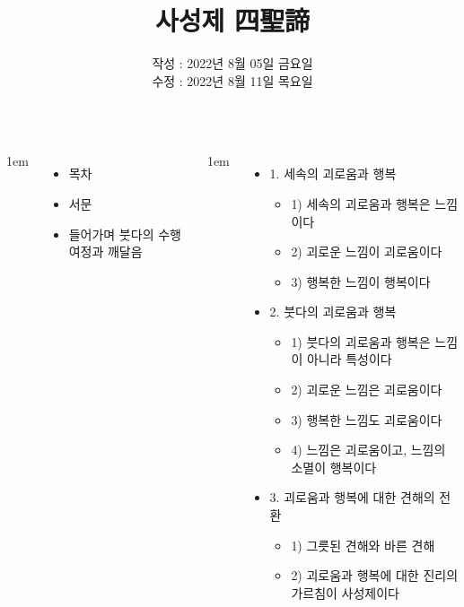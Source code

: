 \documentclass[	17pt, 
							a1paper, 
							portrait, %
							margin=0mm, %
							innermargin=10mm,  		%
							colspace=5mm, 
							subcolspace=0mm
							]{tikzposter}
\title{사성제 四聖諦}
\author{ 	작성 : 2022년 8월 05일 금요일 \\
				수정 : 2022년 8월 11일 목요일  }
\begin{document}
	\maketitle

	\begin{columns}


			{
					\setlength{\leftmargini}{2em}
					\setlength{\labelsep} {1em}
					\begin{itemize}
					\item 목차
					\item 서문
					\item 들어가며  붓다의 수행 여정과 깨달음
					\end{itemize}
			}

			{
					\setlength{\leftmargini}{2em}
					\setlength{\labelsep} {1em}
					\begin{itemize}
					\item 1. 세속의 괴로움과 행복
						\begin{itemize}
						\item 1) 세속의 괴로움과 행복은 느낌이다
						\item 2) 괴로운 느낌이 괴로움이다
						\item 3) 행복한 느낌이 행복이다
						\end{itemize}

					\item 2. 붓다의 괴로움과 행복
						\begin{itemize}
						\item 1) 붓다의 괴로움과 행복은 느낌이 아니라 특성이다
						\item 2) 괴로운 느낌은 괴로움이다
						\item 3) 행복한 느낌도 괴로움이다
						\item 4) 느낌은 괴로움이고, 느낌의 소멸이 행복이다
						\end{itemize}

					\item 3. 괴로움과 행복에 대한 견해의 전환
						\begin{itemize}
						\item 1) 그릇된 견해와 바른 견해
						\item 2) 괴로움과 행복에 대한 진리의 가르침이 사성제이다
						\end{itemize}


\end{itemize}}
\end{columns}
\end{document}
